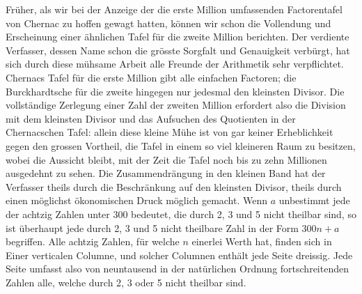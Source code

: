 \documentclass[12pt]{article}
\begin{document}
Früher, als wir bei der Anzeige der die erste Million umfassenden Factorentafel von Chernac zu hoffen gewagt hatten, können wir schon die Vollendung und Erscheinung einer ähnlichen Tafel für die zweite Million berichten. Der verdiente Verfasser, dessen Name schon die grösste Sorgfalt und Genauigkeit verbürgt, hat sich durch diese mühsame Arbeit alle Freunde der Arithmetik sehr verpflichtet. Chernacs Tafel für die erste Million gibt alle einfachen Factoren; die Burckhardtsche für die zweite hingegen nur jedesmal den kleinsten Divisor. Die vollständige Zerlegung einer Zahl der zweiten Million erfordert also die Division mit dem kleinsten Divisor und das Aufsuchen des Quotienten in der Chernacschen Tafel: allein diese kleine Mühe ist von gar keiner Erheblichkeit gegen den grossen Vortheil, die Tafel in einem so viel kleineren Raum zu besitzen, wobei die Aussicht bleibt, mit der Zeit die Tafel noch bis zu zehn Millionen ausgedehnt zu sehen. Die Zusammendrängung in den kleinen Band hat der Verfasser theils durch die Beschränkung auf den kleinsten Divisor, theils durch einen möglichst ökonomischen Druck möglich gemacht. Wenn $a$ unbestimmt jede der achtzig Zahlen unter 300 bedeutet, die durch 2, 3 und 5 nicht theilbar sind, so ist überhaupt jede durch 2, 3 und 5 nicht theilbare Zahl in der Form $300n+a$ begriffen. Alle achtzig Zahlen, für welche $n$ einerlei Werth hat, finden sich in Einer verticalen Columne, und solcher Columnen enthält jede Seite dreissig. Jede Seite umfasst also von neuntausend in der natürlichen Ordnung fortschreitenden Zahlen alle, welche durch 2, 3 oder 5 nicht theilbar sind.
\end{document}
